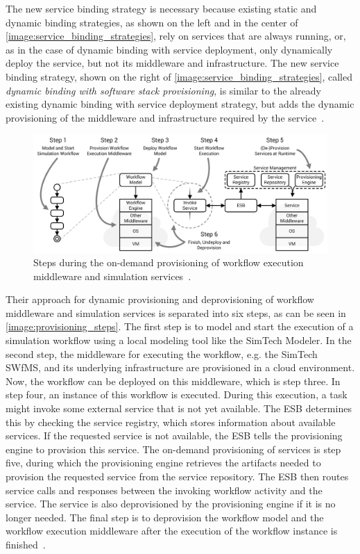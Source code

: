 The new service binding strategy is necessary because existing static and dynamic binding strategies, as shown on the left and in the center of \autoref{image:service_binding_strategies}, rely on services that are always running, or, as in the case of dynamic binding with service deployment, only dynamically deploy the service, but not its middleware and infrastructure.
The new service binding strategy, shown on the right of \autoref{image:service_binding_strategies}, called \textit{dynamic binding with software stack provisioning}, is similar to the already existing dynamic binding with service deployment strategy, but adds the dynamic provisioning of the middleware and infrastructure required by the service~\autocite{provisioning:ondemand}.

\begin{figure}[!htbp]
	\centering
	\includegraphics[resolution=600]{previous/assets/provisioning_steps}
	\caption{Steps during the on-demand provisioning of workflow execution middleware and simulation services~\autocite[based on][]{provisioning:ondemand}.}
	\label{image:provisioning_steps}
\end{figure}

Their approach for dynamic provisioning and deprovisioning of workflow middleware and simulation services is separated into six steps, as can be seen in \autoref{image:provisioning_steps}.
The first step is to model and start the execution of a simulation workflow using a local modeling tool like the SimTech Modeler.
In the second step, the middleware for executing the workflow, e.g. the SimTech SWfMS, and its underlying infrastructure are provisioned in a cloud environment.
Now, the workflow can be deployed on this middleware, which is step three.
In step four, an instance of this workflow is executed.
During this execution, a task might invoke some external service that is not yet available.
The ESB determines this by checking the service registry, which stores information about available services.
If the requested service is not available, the ESB tells the provisioning engine to provision this service.
The on-demand provisioning of services is step five, during which the provisioning engine retrieves the artifacts needed to provision the requested service from the service repository.
The ESB then routes service calls and responses between the invoking workflow activity and the service.
The service is also deprovisioned by the provisioning engine if it is no longer needed.
The final step is to deprovision the workflow model and the workflow execution middleware after the execution of the workflow instance is finished~\autocite{provisioning:ondemand}.

